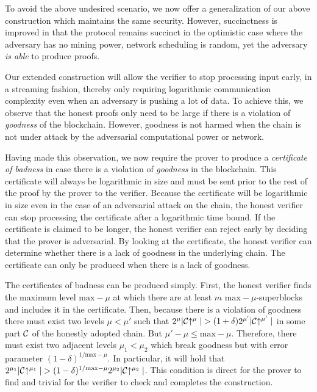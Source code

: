 To avoid the above undesired scenario, we now offer a generalization of our
above construction which maintains the same security. However, succinctness is
improved in that the protocol remains succinct in the optimistic case where the
adversary has no mining power, network scheduling is random, yet the adversary
\textit{is able} to produce proofs.

Our extended construction will allow the verifier to stop processing input
early, in a streaming fashion, thereby only requiring logarithmic communication
complexity even when an adversary is pushing a lot of data. To achieve this, we
observe that the honest proofs only need to be large if there is a violation of
\textit{goodness} of the blockchain. However, goodness is not harmed when the
chain is not under attack by the adversarial computational power or network.

Having made this observation, we now require the prover to produce a
\textit{certificate of badness} in case there is a violation of
\textit{goodness} in the blockchain. This certificate will always be logarithmic
in size and must be sent prior to the rest of the proof by the prover to the
verifier. Because the certificate will be logarithmic in size even in the case
of an adversarial attack on the chain, the honest verifier can stop processing
the certificate after a logarithmic time bound. If the certificate is claimed to
be longer, the honest verifier can reject early by deciding that the prover is
adversarial. By looking at the certificate, the honest verifier can determine
whether there is a lack of goodness in the underlying chain. The certificate can
only be produced when there is a lack of goodness.

The certificates of badness can be produced simply. First, the honest verifier
finds the maximum level $\text{max}-\mu$ at which there are at least $m$
$\text{max}-\mu$-superblocks and includes it in the certificate. Then, because
there is a violation of goodness there must exist two levels $\mu < \mu'$ such
that $2^\mu|\mathcal{C}\negthickspace\uparrow^\mu| > (1 + \delta)2^{\mu'}|\mathcal{C}\negthickspace\uparrow^{\mu'}|$
in some part $\mathcal{C}$ of the honestly adopted chain. But $\mu' - \mu \leq
\text{max}-\mu$. Therefore, there must exist two adjacent levels $\mu_1 < \mu_2$
which break goodness but with error parameter
$(1 - \delta)^{1/{\text{max}-\mu}}$. In particular, it will hold that
$2^{\mu_1}|\mathcal{C}\negthickspace\uparrow^{\mu_1}| >
 (1 - \delta)^{1/{\text{max}-\mu}}2^{\mu_2}|\mathcal{C}\negthickspace\uparrow^{\mu_2}|$. This
condition is direct for the prover to find and trivial for the verifier to
check and completes the construction.

